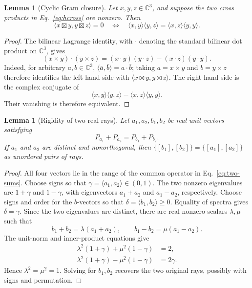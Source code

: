 \documentclass[twocolumn,aps,pra,floatfix,amsmath,amssymb,longbibliography]{revtex4-2}
\newtheorem{lemma}[theorem]{Lemma}
\theoremstyle{definition}
\theoremstyle{remark}
\newcommand{\C}{\mathbb C}
\begin{document}
\begin{lemma}[Cyclic Gram closure]
\label{lem:gram-closure}
Let $x,y,z\in\C^3$, and suppose the two cross products in
Eq.~\eqref{eq:hcross} are nonzero.  Then
\begin{equation}
 \langle x\boxtimes y,y\boxtimes z\rangle=0
 \quad\Longleftrightarrow\quad
 \langle x,y\rangle\langle y,z\rangle
 =\langle x,z\rangle\langle y,y\rangle.
 \label{eq:gram-closure}
\end{equation}
\end{lemma}

\begin{proof}
The bilinear Lagrange identity, with $\mathbin{\cdot}$ denoting the standard
bilinear dot product on $\C^3$, gives
\[
 (x\times y)\mathbin{\cdot}(\bar y\times\bar z)
 =(x\mathbin{\cdot}\bar y)(y\mathbin{\cdot}\bar z)
 -(x\mathbin{\cdot}\bar z)(y\mathbin{\cdot}\bar y).
\]
Indeed, for arbitrary $a,b\in\C^3$,
$\langle\bar a,\bar b\rangle=a\mathbin{\cdot}\bar b$; taking
$a=x\times y$ and $b=y\times z$ therefore identifies the left-hand side
with $\langle x\boxtimes y,y\boxtimes z\rangle$.  The right-hand side
is the complex conjugate of
\[
 \langle x,y\rangle\langle y,z\rangle
 -\langle x,z\rangle\langle y,y\rangle.
\]
Their vanishing is therefore equivalent.
\end{proof}

\begin{lemma}[Rigidity of two real rays]
\label{lem:real-rigidity}
Let $a_1,a_2,b_1,b_2$ be real unit vectors satisfying
\begin{equation}
 P_{a_1}+P_{a_2}=P_{b_1}+P_{b_2}.
 \label{eq:two-sums}
\end{equation}
If $a_1$ and $a_2$ are distinct and nonorthogonal, then
$\{[b_1],[b_2]\}=\{[a_1],[a_2]\}$ as unordered pairs of rays.
\end{lemma}

\begin{proof}
All four vectors lie in the range of the common operator in
Eq.~\eqref{eq:two-sums}.  Choose signs so that
$\gamma=\langle a_1,a_2\rangle\in(0,1)$.  The two nonzero eigenvalues
are $1+\gamma$ and $1-\gamma$, with eigenvectors $a_1+a_2$ and
$a_1-a_2$, respectively.  Choose signs and order for the $b$-vectors so
that $\delta=\langle b_1,b_2\rangle\ge0$.  Equality of spectra gives
$\delta=\gamma$.  Since the two eigenvalues are distinct, there are real
nonzero scalars $\lambda,\mu$ such that
\[
 b_1+b_2=\lambda(a_1+a_2),\qquad
 b_1-b_2=\mu(a_1-a_2).
\]
The unit-norm and inner-product equations give
\begin{align*}
 \lambda^2(1+\gamma)+\mu^2(1-\gamma)&=2,\\
 \lambda^2(1+\gamma)-\mu^2(1-\gamma)&=2\gamma.
\end{align*}
Hence $\lambda^2=\mu^2=1$.  Solving for $b_1,b_2$ recovers the two
original rays, possibly with signs and permutation.
\end{proof}
\end{document}
